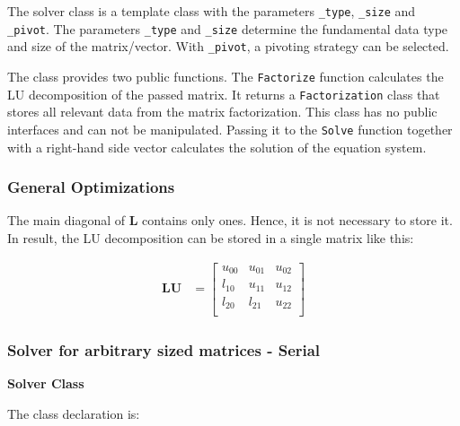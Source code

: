 The solver class is a template class with the parameters \texttt{_type}, \texttt{_size} and \texttt{_pivot}.
The parameters \texttt{_type} and \texttt{_size} determine the fundamental data type and size of the matrix/vector.
With \texttt{_pivot}, a pivoting strategy can be selected.

The class provides two public functions.
The \texttt{Factorize} function calculates the LU decomposition of the passed matrix. 
It returns a \texttt{Factorization} class that stores all relevant data from the matrix factorization.
This class has no public interfaces and can not be manipulated.
Passing it to the \texttt{Solve} function together with a right-hand side vector calculates the solution of the equation system.


\subsubsection{General Optimizations}
\label{sec:LUOptimizations}

The main diagonal of $\mathbf{L}$ contains only ones.
Hence, it is not necessary to store it.
In result, the LU decomposition can be stored in a single matrix like this:

\begin{align}
\mathbf{LU} 
& =
\begin{bmatrix}
u_{00} &u_{01} &u_{02}\\
l_{10} &u_{11} &u_{12}\\
l_{20} &l_{21} &u_{22}\\
\end{bmatrix}
\end{align}


\newpage
\subsubsection{Solver for arbitrary sized matrices - Serial}

\vspace{0.5cm}
\textbf{Solver Class}
\vspace{0.5cm}

The class declaration is:

